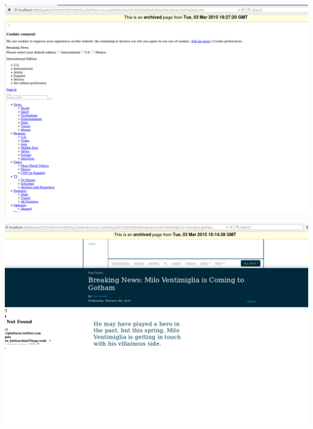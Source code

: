 \newpage
\begin{minipage}{\linewidth}
	\includegraphics[scale=0.55]{figures/playback/pywb_7_wget.PNG}
	\label{sizeURI3}
\end{minipage}
\newpage
\begin{minipage}{\linewidth}
	\includegraphics[scale=0.55]{figures/playback/pywb_24_warcreate.PNG}
	\label{sizeURI3}
\end{minipage}
\newpage
